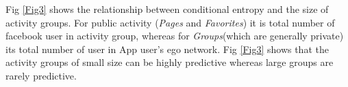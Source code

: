 







Fig \ref{Fig3} shows the relationship between conditional
    entropy and the size of activity groups. For public activity ({\em Pages} and 
    {\em Favorites}) it is total number of facebook user in activity group, whereas
    for {\em Groups}(which are generally private) its total number of user in App 
    user's ego network. Fig \ref{Fig3} shows that the activity groups of small 
    size can be highly predictive whereas large groups are rarely predictive.

